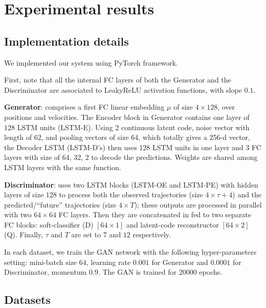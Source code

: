 \documentclass[10pt,twocolumn,letterpaper]{article}
\begin{document}
 
\section{Experimental results}


\def \xObsv {\mathbf{x}^i_{-\tau: 0}}
\def \xPred {\mathbf{x}^i_{1: T}}
\def \XObsv {\mathbf{X}^{-i}_{-\tau: 0}}
\def \XPred {\mathbf{X}^{-i}_{1: T}}

\def \xPredH {\mathbf{\hat{x}}^i_{1: T}}
\def \XPredH {\mathbf{\hat{X}}^{-i}_{1: T}}

\def \TEOM {\mathbf{\hat{m}}^i_{1: T}}
 \subsection{Implementation details}
\label{subsec:implementation}
We implemented our system using PyTorch framework.

First, note that all the internal FC layers of both the Generator and the Discriminator are associated to  LeakyReLU activation functions, with slope $0.1$. 

{\textbf{Generator}: comprises a first FC linear embedding $\mu$ of size $4\times 128$, over positions and velocities. The Encoder block in Generator contains one layer of $128$ LSTM units (LSTM-E). Using 2 continuous latent code, noise vector with length of 62, and pooling vectors of size 64, which totally gives a 256-d vector, the Decoder LSTM (LSTM-D's) then uses 128 LSTM units in one layer and 3 FC layers with size of 64, 32, 2 to decode the predictions.} Weights are shared among LSTM layers with the same function.

\textbf{Discriminator}: uses two LSTM blocks (LSTM-OE and LSTM-PE) with hidden layers of size $128$ to process both the observed trajectories (size $4 \times \tau + 4$) and the predicted/``future'' trajectories (size $4 \times T$); these outputs are processed in parallel with two $64\times 64$ FC layers. Then they are concatenated in fed to two separate FC blocks: soft-classifier (D) $[64 \times 1]$ and latent-code reconstructor $[64 \times 2]$ (Q). Finally, $\tau$ and $T$ are set to $7$ and $12$ respectively.

 In each dataset, we train the GAN network with the following hyper-parameters setting: mini-batch size $64$, learning rate $0.001$ for Generator and $0.0001$ for Discriminator, momentum $0.9$. The GAN is trained for $20000$ epochs.

\subsection{Datasets}
\end{document}
